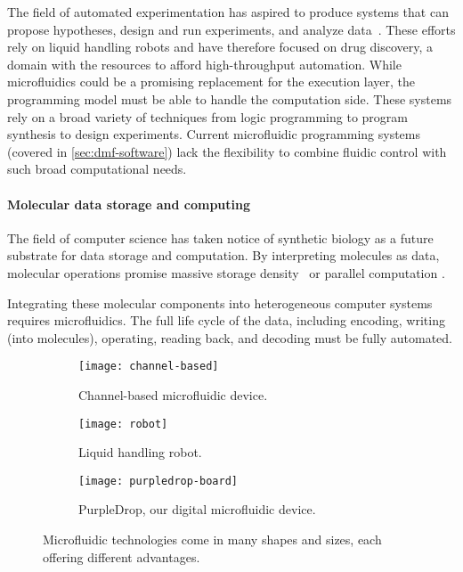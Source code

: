 \documentclass[sigplan, screen]{acmart}
\newcommand\mw[2][]{\todo[color=blue!20, #1]{\sf #2}}
\begin{document}
The field of automated experimentation has aspired to produce systems that can propose hypotheses, design and run experiments, and analyze data~\cite{king85, king2004, schneider2017automating, sparkes2010towards}.
These efforts rely on liquid handling robots and have therefore focused on drug discovery, a domain with the resources to afford high-throughput automation.
While microfluidics could be a promising replacement for the execution layer, the programming model must be able to handle the computation side.
These systems rely on a broad variety of techniques from logic programming \cite{king85} to program synthesis \cite{koksal2013} to design experiments.
Current microfluidic programming systems (covered in \autoref{sec:dmf-software}) lack the flexibility to combine fluidic control with such broad computational needs.

\paragraph{Molecular data storage and computing}

The field of computer science has taken notice of synthetic biology as a future substrate for data storage and computation.
By interpreting molecules as data, molecular operations promise massive storage density~\cite{nbt, goldman2013towards, church2012} or parallel computation \cite{stewart18, qian2011scaling, zhang_dynamic_2011}.

\mw{Add more detailed hybrid systems shout out}
Integrating these molecular components into heterogeneous computer systems requires microfluidics.
The full life cycle of the data, including encoding, writing (into molecules), operating, reading back, and decoding must be fully automated.

\begin{figure}
  \centering
  \captionsetup[subfigure]{font=small, justification=raggedright}
  \begin{subfigure}[t]{0.32\linewidth}
    \centering
    \texttt{[image: channel-based]}
    \caption{Channel-based microfluidic device. \cite{channel-img}}
    \label{fig:channel-based}
  \end{subfigure}
  \begin{subfigure}[t]{0.32\linewidth}
    \centering
    \texttt{[image: robot]}
    \caption{Liquid handling robot. \cite{robot-img}}
    \label{fig:robot}
  \end{subfigure}
  \begin{subfigure}[t]{0.32\linewidth}
    \centering
    \texttt{[image: purpledrop-board]}
    \caption{PurpleDrop, our digital microfluidic device.}
    \label{fig:purpledrop-dmf}
  \end{subfigure}

  \caption{
    Microfluidic technologies come in many shapes and sizes, each offering different advantages.
  }
  \label{fig:microfluidic-types}
\end{figure}
\end{document}
